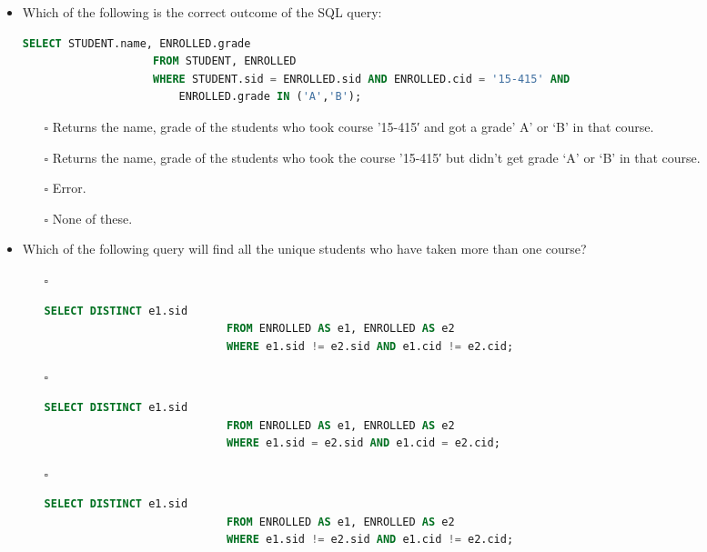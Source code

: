 \documentclass[10pt]{article}
\begin{document}
\begin{itemize}
			\item Which of the following is the correct outcome of the SQL query: 
				\begin{lstlisting}[language=SQL,firstline=1, lastline=4]
					SELECT STUDENT.name, ENROLLED.grade 
					FROM STUDENT, ENROLLED 
					WHERE STUDENT.sid = ENROLLED.sid AND ENROLLED.cid = '15-415' AND 
						ENROLLED.grade IN ('A','B');
				\end{lstlisting}

				\begin{enumerate}
					\item[$\square$] Returns the name, grade of the students who took course ’15-415′ and got a grade’ A’ or ‘B’ in that course.
					\item[$\square$] Returns the name, grade of the students who took the course ’15-415′ but didn’t get grade ‘A’ or ‘B’ in that course.
					\item[$\square$] Error.
					\item[$\square$] None of these.
				\end{enumerate}

			\item Which of the following query will find all the unique students who have taken more than one course?
				\begin{enumerate}
					\item[$\square$] 
						\begin{lstlisting}[language=SQL,firstline=1, lastline=3, numbers = right] 
							SELECT DISTINCT e1.sid 
							FROM ENROLLED AS e1, ENROLLED AS e2 
							WHERE e1.sid != e2.sid AND e1.cid != e2.cid;
						\end{lstlisting}

					\item[$\square$] 
						\begin{lstlisting}[language=SQL,firstline=1, lastline=3, numbers = right] 
							SELECT DISTINCT e1.sid 
							FROM ENROLLED AS e1, ENROLLED AS e2 
							WHERE e1.sid = e2.sid AND e1.cid = e2.cid;
						\end{lstlisting}
					
					\item[$\square$] 
						\begin{lstlisting}[language=SQL,firstline=1, lastline=3, numbers = right] 
							SELECT DISTINCT e1.sid 
							FROM ENROLLED AS e1, ENROLLED AS e2 
							WHERE e1.sid != e2.sid AND e1.cid != e2.cid;
						\end{lstlisting}
					

\end{enumerate}
\end{itemize}
\end{document}
